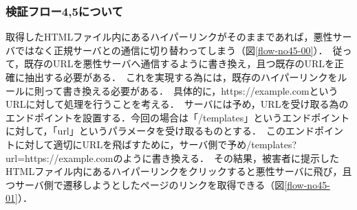 \documentclass[dvipdfmx,twocolumn]{jsarticle}
\begin{document}
            \subsubsection{検証フロー4,5について}
                取得したHTMLファイル内にあるハイパーリンクがそのままであれば，悪性サーバではなく正規サーバとの通信に切り替わってしまう（図\ref{flow-no45-00}）．\
                従って，既存のURLを悪性サーバへ通信するように書き換え，且つ既存のURLを正確に抽出する必要がある．\
                これを実現する為には，既存のハイパーリンクをルールに則って書き換える必要がある．\
                具体的に，https://example.comというURLに対して処理を行うことを考える．\
                サーバには予め，URLを受け取る為のエンドポイントを設置する．今回の場合は「/templates」というエンドポイントに対して，「url」というパラメータを受け取るものとする．\
                このエンドポイントに対して適切にURLを飛ばすために，サーバ側で予め/templates?url=https://example.comのように書き換える．\
                その結果，被害者に提示したHTMLファイル内にあるハイパーリンクをクリックすると悪性サーバに飛び，且つサーバ側で遷移しようとしたページのリンクを取得できる（図\ref{flow-no45-01}）．
\end{document}
